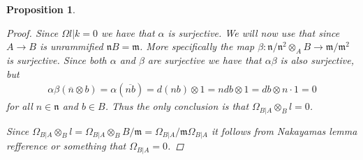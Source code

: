 \documentclass[11pt, a4paper, english]{article}
\newtheorem{prop}{Proposition}
\numberwithin{prop}{section}
\numberwithin{lemma}{section}
\numberwithin{theorem}{section}
\numberwithin{defin}{section}
\numberwithin{example}{section}
\begin{document}
\begin{prop}
\begin{proof}
Since $\Omega{l|k}=0$ we have that $\alpha$ is surjective. We will now use that since $A \to B$ is unrammified $\mathfrak{n}B = \mathfrak{m}$. More specifically the map $\beta: \mathfrak{n}/\mathfrak{n}^2 \otimes_A B \to \mathfrak{m}/\mathfrak{m}^2$ is surjective. Since both $\alpha$ and $\beta$ are surjective we have that $\alpha\beta$ is also surjective, but 
\begin{align*}
\alpha\beta(\overline{n} \otimes b) = \alpha(\overline{nb}) = d(nb) \otimes 1 = ndb \otimes 1 = db \otimes n \cdot 1 = 0
\end{align*}
for all $n \in \mathfrak{n}$ and $b \in B$. Thus the only conclusion is that $\Omega_{B|A} \otimes_B l = 0$.

Since $\Omega_{B|A} \otimes_B l = \Omega_{B|A} \otimes_B B/\mathfrak{m} = \Omega_{B|A}/\mathfrak{m}\Omega_{B|A}$ it follows from Nakayamas lemma {\color{red} refference or something} that $\Omega_{B|A}=0$.
\end{proof}
\end{prop}
\end{document}
